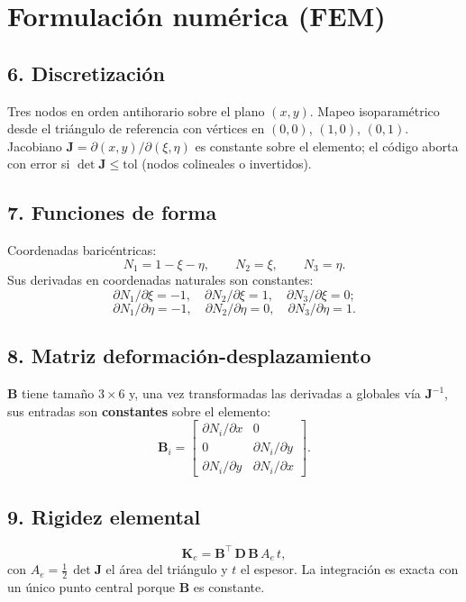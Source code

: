 \documentclass[11pt,letterpaper,oneside]{report}
\begin{document}
\section{Formulación numérica (FEM)}

\subsection{6. Discretización}
Tres nodos en orden antihorario sobre el plano $(x, y)$. Mapeo isoparamétrico desde el triángulo de referencia con vértices en $(0, 0)$, $(1, 0)$, $(0, 1)$. Jacobiano $\mathbf{J} = \partial(x, y) / \partial(\xi, \eta)$ es constante sobre el elemento; el código aborta con error si $\det \mathbf{J} \le \text{tol}$ (nodos colineales o invertidos).

\subsection{7. Funciones de forma}
Coordenadas baricéntricas:
\[
N_1 = 1 - \xi - \eta, \qquad N_2 = \xi, \qquad N_3 = \eta.
\]
Sus derivadas en coordenadas naturales son constantes:
\[
\partial N_1 / \partial \xi = -1, \quad \partial N_2 / \partial \xi = 1, \quad \partial N_3 / \partial \xi = 0;
\]
\[
\partial N_1 / \partial \eta = -1, \quad \partial N_2 / \partial \eta = 0, \quad \partial N_3 / \partial \eta = 1.
\]

\subsection{8. Matriz deformación-desplazamiento}
$\mathbf{B}$ tiene tamaño $3 \times 6$ y, una vez transformadas las derivadas a globales vía $\mathbf{J}^{-1}$, sus entradas son \textbf{constantes} sobre el elemento:
\[
\mathbf{B}_i = \begin{bmatrix} \partial N_i / \partial x & 0 \\ 0 & \partial N_i / \partial y \\ \partial N_i / \partial y & \partial N_i / \partial x \end{bmatrix}.
\]

\subsection{9. Rigidez elemental}
\[
\mathbf{K}_e = \mathbf{B}^\top\, \mathbf{D}\, \mathbf{B}\, A_e\, t,
\]
con $A_e = \tfrac{1}{2}\, \det \mathbf{J}$ el área del triángulo y $t$ el espesor. La integración es exacta con un único punto central porque $\mathbf{B}$ es constante.
\end{document}
